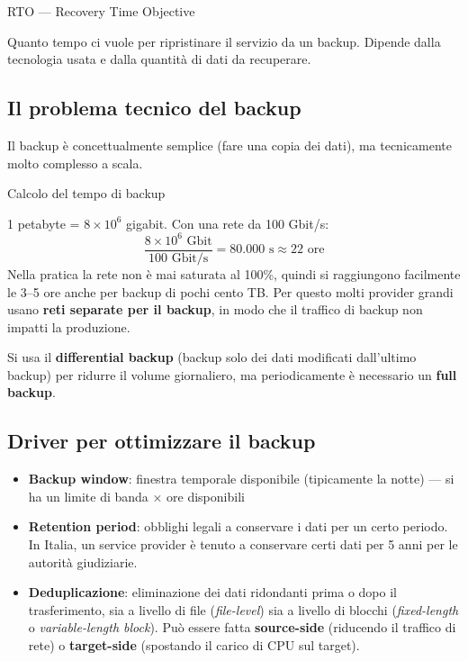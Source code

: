 \documentclass[
  italian,
  openany]{book}
\providecommand{\tightlist}{%
  \setlength{\itemsep}{0pt}\setlength{\parskip}{0pt}}
\begin{document}
\begin{calloutdefinition}{RTO — Recovery Time Objective}

Quanto tempo ci vuole per ripristinare il servizio da un backup. Dipende
dalla tecnologia usata e dalla quantità di dati da recuperare.

\end{calloutdefinition}

\subsection{Il problema tecnico del
backup}\label{il-problema-tecnico-del-backup}

Il backup è concettualmente semplice (fare una copia dei dati), ma
tecnicamente molto complesso a scala.

\begin{callouttip}{Calcolo del tempo di backup}

1 petabyte = \(8 \times 10^6\) gigabit. Con una rete da 100 Gbit/s:
\[\frac{8 \times 10^6 \text{ Gbit}}{100 \text{ Gbit/s}} = 80.000 \text{ s} \approx 22 \text{ ore}\]
Nella pratica la rete non è mai saturata al 100\%, quindi si raggiungono
facilmente le 3--5 ore anche per backup di pochi cento TB. Per questo
molti provider grandi usano \textbf{reti separate per il backup}, in
modo che il traffico di backup non impatti la produzione.

\end{callouttip}

Si usa il \textbf{differential backup} (backup solo dei dati modificati
dall'ultimo backup) per ridurre il volume giornaliero, ma periodicamente
è necessario un \textbf{full backup}.

\subsection{Driver per ottimizzare il
backup}\label{driver-per-ottimizzare-il-backup}

\begin{itemize}
\tightlist
\item
  \textbf{Backup window}: finestra temporale disponibile (tipicamente la
  notte) --- si ha un limite di banda × ore disponibili
\item
  \textbf{Retention period}: obblighi legali a conservare i dati per un
  certo periodo. In Italia, un service provider è tenuto a conservare
  certi dati per 5 anni per le autorità giudiziarie.
\item
  \textbf{Deduplicazione}: eliminazione dei dati ridondanti prima o dopo
  il trasferimento, sia a livello di file (\emph{file-level}) sia a
  livello di blocchi (\emph{fixed-length} o \emph{variable-length
  block}). Può essere fatta \textbf{source-side} (riducendo il traffico
  di rete) o \textbf{target-side} (spostando il carico di CPU sul
  target).
\end{itemize}
\end{document}
